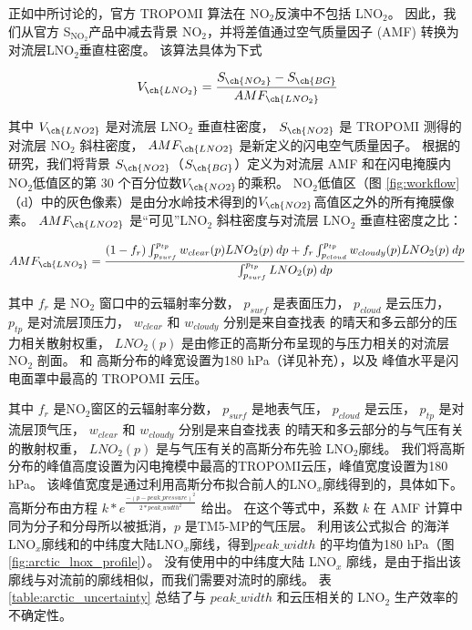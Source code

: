 正如\citet{Zhang.2022a}中所讨论的，官方 TROPOMI 算法在 NO$_2$反演中不包括 LNO$_2$。
因此，我们从官方 S$_{\textrm{NO$_2$}}$产品中减去背景 NO$_2$，并将差值通过空气质量因子 (AMF) 转换为对流层LNO$_2$垂直柱密度。
该算法具体为下式


\begin{equation} \label{eq:arctic_LNO2}
V_{\ch{LNO_2}} = \frac{S_{\ch{NO_2}} - S_{\ch{BG}}}{AMF_{\ch{LNO_2}}}
\end{equation}


其中 $V_{\ch{LNO2}}$ 是对流层 LNO$_2$ 垂直柱密度，
$S_{\ch{NO2}}$ 是 TROPOMI 测得的对流层 NO$_2$ 斜柱密度，
$AMF_{\ch{LNO2}}$ 是新定义的闪电空气质量因子。
根据\citet{Allen.2021a}的研究，我们将背景 $S_{\ch{NO2}}$（$S_{\ch{BG}}$）定义为对流层 AMF 和在闪电掩膜内NO$_2$低值区的第 30 个百分位数$V_{\ch{NO2}}$的乘积。
NO$_2$低值区（图 \ref{fig:workflow}（d）中的灰色像素）是由分水岭技术得到的$V_{\ch{NO2}}$高值区之外的所有掩膜像素。
$AMF_{\ch{LNO2}}$ 是“可见”LNO$_2$ 斜柱密度与对流层 LNO$_2$ 垂直柱密度之比：

\begin{equation} \label{eq:arctic_AMFLNO2}
AMF_{\ch{LNO_2}} = \frac{(1-f_r) \int_{p_{surf}}^{p_{tp}} w_{clear}(p) LNO_2(p) \: dp + f_r \int_{p_{cloud}}^{p_{tp}} w_{cloudy}(p) LNO_2(p) \: dp}{\int_{p_{surf}}^{p_{tp}} LNO_2(p) \: dp}
\end{equation}

其中 $f_{r}$ 是 NO$_2$ 窗口中的云辐射率分数，
$p_{surf}$ 是表面压力，
$p_{cloud}$ 是云压力，
$p_{tp}$ 是对流层顶压力，
$w_{clear}$ 和 $w_{cloudy}$ 分别是来自查找表 \cite{Lorente.2017} 的晴天和多云部分的压力相关散射权重，
$LNO_2(p)$ 是由修正的高斯分布呈现的与压力相关的对流层 NO$_2$ 剖面。
\citeauthor{Ott.2010} \cite{Ott.2010} 和 \citeauthor{Luo.2017} \cite{Luo.2017} 高斯分布的峰宽设置为180 hPa（详见补充），以及 峰值水平是闪电面罩中最高的 TROPOMI 云压。

其中 $f_{r}$ 是NO$_2$窗区的云辐射率分数，
$p_{surf}$ 是地表气压，
$p_{cloud}$ 是云压，
$p_{tp}$ 是对流层顶气压，
$w_{clear}$ 和 $w_{cloudy}$ 分别是来自查找表 \citep{Lorente.2017}的晴天和多云部分的与气压有关的散射权重，
$LNO_2(p)$ 是与气压有关的高斯分布先验 LNO$_2$廓线。
我们将高斯分布的峰值高度设置为闪电掩模中最高的TROPOMI云压，峰值宽度设置为180 hPa。
该峰值宽度是通过利用高斯分布拟合前人的LNO$_x$廓线得到的，具体如下。
高斯分布由方程 $k*e^\frac{{-{(p - peak\_pressure)}^2}}{2*peak\_width^{2}}$ 给出。
在这个等式中，系数 $k$ 在 AMF 计算中同为分子和分母所以被抵消，$p$ 是TM5-MP的气压层。
利用该公式拟合 \citet{Ott.2010} 的海洋LNO$_x$廓线和\citet{Luo.2017}的中纬度大陆LNO$_x$廓线，得到$peak\_width$ 的平均值为180 hPa（图\ref{fig:arctic_lnox_profile}）。
没有使用\citet{Ott.2010}中的中纬度大陆 LNO$_x$ 廓线，是由于\citet{Luo.2017}指出该廓线与对流前的廓线相似，而我们需要对流时的廓线。
表 \ref{table:arctic_uncertainty} 总结了与 $peak\_width$ 和云压相关的 LNO$_2$ 生产效率的不确定性。

